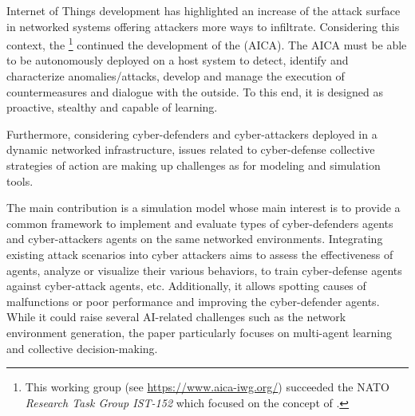 

\noindent
Internet of Things development has highlighted an increase of the attack surface in networked systems offering attackers more ways to infiltrate.
Considering this context, the \footnote{This working group (see \url{https://www.aica-iwg.org/}) succeeded the NATO \textit{Research Task Group IST-152} which focused on the concept of .} continued the development of the  (AICA).
The AICA must be able to be autonomously deployed on a host system to detect, identify and characterize anomalies/attacks, develop and manage the execution of countermeasures and dialogue with the outside. To this end, it is designed as proactive, stealthy and capable of learning.

Furthermore, considering cyber-defenders and cyber-attackers deployed in a dynamic networked infrastructure, issues related to cyber-defense collective strategies of action are making up challenges as for modeling and simulation tools.

\noindent
The main contribution is a simulation model whose main interest is to provide a common framework to implement and evaluate types of cyber-defenders agents and cyber-attackers agents on the same networked environments. Integrating existing attack scenarios into cyber attackers aims to assess the effectiveness of agents, analyze or visualize their various behaviors, to train cyber-defense agents against cyber-attack agents, etc. Additionally, it allows spotting causes of malfunctions or poor performance and improving the cyber-defender agents. While it could raise several AI-related challenges such as the network environment generation, the paper particularly focuses on multi-agent learning and collective decision-making.

